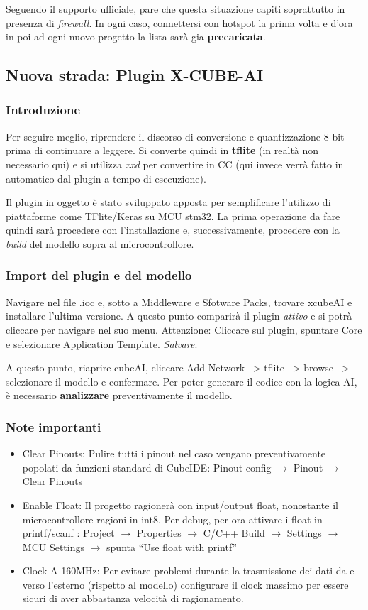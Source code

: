 Seguendo il supporto ufficiale, pare che questa situazione capiti soprattutto in presenza di \textit{firewall}. In ogni caso, connettersi con hotspot la prima volta e d'ora in poi ad ogni nuovo progetto la lista sarà gia \textbf{precaricata}.

\subsection{Nuova strada: Plugin X-CUBE-AI}
\subsubsection{Introduzione}
Per seguire meglio, riprendere il discorso di conversione e quantizzazione 8 bit prima di continuare a leggere. Si converte quindi in \textbf{tflite} (in realtà non necessario qui) e si utilizza \textit{xxd} per convertire in CC (qui invece verrà fatto in automatico dal plugin a tempo di esecuzione).

Il plugin in oggetto è stato sviluppato apposta per semplificare l'utilizzo di piattaforme come TFlite/Keras su MCU stm32. La prima operazione da fare quindi sarà procedere con l'installazione e, successivamente, procedere con la \textit{build} del modello sopra al microcontrollore.

\subsubsection{Import del plugin e del modello}
Navigare nel file .ioc e, sotto a Middleware e Sfotware Packs, trovare xcubeAI e installare l'ultima versione. A questo punto comparirà il plugin \textit{attivo} e si potrà cliccare per navigare nel suo menu. Attenzione: Cliccare sul plugin, spuntare Core e selezionare Application Template. \textit{Salvare}.

A questo punto, riaprire cubeAI, cliccare Add Network --> tflite --> browse --> selezionare il modello e confermare. Per poter generare il codice con la logica AI, è necessario \textbf{analizzare} preventivamente il modello.

\subsubsection{Note importanti}
\begin{itemize}
    \item Clear Pinouts: Pulire tutti i pinout nel caso vengano preventivamente popolati da funzioni standard di CubeIDE: Pinout config $\rightarrow$ Pinout $\rightarrow$ Clear Pinouts
    \item Enable Float: Il progetto ragionerà con input/output float, nonostante il microcontrollore ragioni in int8. Per debug, per ora attivare i float in printf/scanf : Project $\rightarrow$ Properties $\rightarrow$ C/C++ Build $\rightarrow$ Settings $\rightarrow$ MCU Settings $\rightarrow$ spunta “Use float with printf”
    \item Clock A 160MHz: Per evitare problemi durante la trasmissione dei dati da e verso l’esterno (rispetto al modello) configurare il clock massimo per essere sicuri di aver abbastanza velocità di ragionamento.
\end{itemize}

